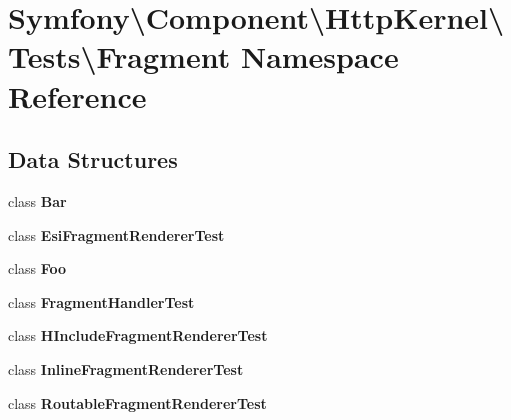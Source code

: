 \section{Symfony\textbackslash{}Component\textbackslash{}Http\+Kernel\textbackslash{}Tests\textbackslash{}Fragment Namespace Reference}
\label{namespace_symfony_1_1_component_1_1_http_kernel_1_1_tests_1_1_fragment}
\subsection*{Data Structures}
\begin{DoxyCompactItemize}
\item 
class {\bf Bar}
\item 
class {\bf Esi\+Fragment\+Renderer\+Test}
\item 
class {\bf Foo}
\item 
class {\bf Fragment\+Handler\+Test}
\item 
class {\bf H\+Include\+Fragment\+Renderer\+Test}
\item 
class {\bf Inline\+Fragment\+Renderer\+Test}
\item 
class {\bf Routable\+Fragment\+Renderer\+Test}
\end{DoxyCompactItemize}
